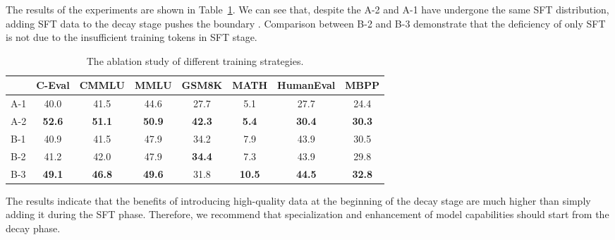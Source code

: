 The results of the experiments are shown in Table~\ref{tab:dataexperiments}. We can see that, despite the  
A-2 and A-1 have undergone the same SFT distribution, adding SFT data to the decay stage pushes the boundary 
. Comparison between B-2 and B-3 demonstrate that the deficiency of only SFT is not due to the insufficient training tokens in SFT stage. 

\begin{table}[h]
\centering
\begin{tabular}{lccccccc}
\toprule
            & \textbf{C-Eval} & \textbf{CMMLU} & \textbf{MMLU} & \textbf{GSM8K} & \textbf{MATH} & \textbf{HumanEval} & \textbf{MBPP} \\ \midrule
A-1 & 40.0  & 41.5  & 44.6 & 27.7  & 5.1  & 27.7      & 24.4 \\
A-2 & \textbf{52.6}  & \textbf{51.1} & \textbf{50.9} & \textbf{42.3 } & \textbf{5.4}  & \textbf{30.4 }     & \textbf{30.3} \\
\midrule

B-1 &   40.9  & 41.5 & 47.9 &  34.2 & 7.9   &  43.9 & 30.5 \\
B-2 &  41.2 &  42.0 &    47.9  & \textbf{34.4} & 7.3 &  43.9 & 29.8  \\ 
B-3 & \textbf{49.1}  & \textbf{46.8}  & \textbf{49.6} & 31.8  & \textbf{10.5}  & \textbf{44.5}  & \textbf{32.8}\\
\bottomrule
\end{tabular}
\caption{The ablation study of different training strategies.
}
\label{tab:dataexperiments}
\end{table}

The results indicate that the benefits of introducing high-quality data at the beginning of the decay stage are much higher than simply adding it during the SFT phase. Therefore, we recommend that specialization and enhancement of model capabilities should start from the decay phase. 







